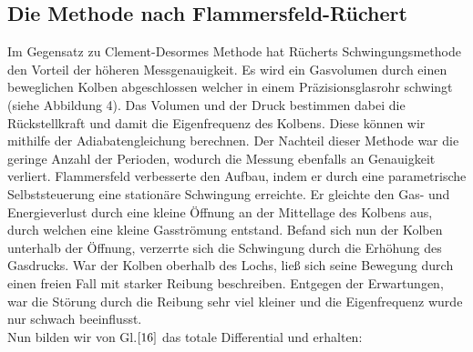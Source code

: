 \documentclass{article}
\begin{document}
{{\begin{center}
\begin{minipage}{\linewidth}
\centering
{}
\label{wtd}
\end{minipage}
\end{center}

\subsection{Die Methode nach Flammersfeld-Rüchert}
Im Gegensatz zu Clement-Desormes Methode hat Rücherts Schwingungsmethode den Vorteil der höheren Messgenauigkeit. Es wird ein Gasvolumen durch einen beweglichen Kolben abgeschlossen welcher in einem Präzisionsglasrohr schwingt (siehe Abbildung 4). Das Volumen und der Druck bestimmen dabei die Rückstellkraft und damit die Eigenfrequenz des Kolbens. Diese können wir mithilfe der Adiabatengleichung berechnen. Der Nachteil dieser Methode war die geringe Anzahl der Perioden, wodurch die Messung ebenfalls an Genauigkeit verliert. Flammersfeld verbesserte den Aufbau, indem er durch eine parametrische Selbststeuerung eine stationäre Schwingung erreichte. Er gleichte den Gas- und Energieverlust durch eine kleine Öffnung an der Mittellage des Kolbens aus, durch welchen eine kleine Gasströmung entstand.
Befand sich nun der Kolben unterhalb der Öffnung, verzerrte sich die Schwingung durch die Erhöhung des Gasdrucks. War der Kolben oberhalb des Lochs, ließ sich seine Bewegung durch einen freien Fall mit starker Reibung beschreiben. Entgegen der Erwartungen, war die Störung durch die Reibung sehr viel kleiner und die Eigenfrequenz wurde nur schwach beeinflusst.\\
Nun bilden wir von Gl.\(\eqref{16}\) das totale Differential und erhalten:

}}
\end{document}
